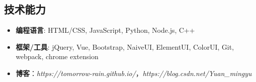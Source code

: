 \documentclass{resume}
\begin{document}
\begin{spacing}{1.2}
\vspace{0.2em}

\section{技术能力}
\begin{itemize}[parsep=0.8ex]
  \item \textbf{编程语言}: HTML/CSS, JavaScript, Python, Node.js, C++
  \item \textbf{框架/工具}: jQuery, Vue, Bootstrap, NaiveUI, ElementUI, ColorUI, Git, webpack, chrome extension
  \item \textbf{博客}：\textit{https://tomorrow-rain.github.io/}，\textit{https://blog.csdn.net/Yuan\_mingyu}
\end{itemize}


\end{spacing}
\end{document}
